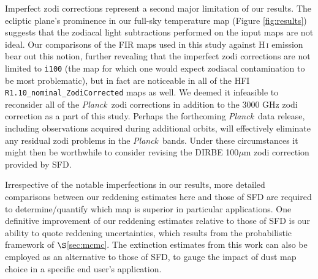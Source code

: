 \documentclass{emulateapj}
\newcommand{\PLANCK}{{\it Planck}}
\begin{document}
Imperfect zodi corrections represent a second major limitation of our results.
The ecliptic plane's prominence in our full-sky temperature map (Figure 
\ref{fig:results}) suggests that the zodiacal light subtractions performed on 
the input maps are not ideal. Our comparisons of the FIR maps used in this 
study against H\,\textsc{i} emission bear out this notion, further revealing 
that the imperfect zodi corrections are not limited to \verb|i100| (the 
map for which one would expect zodiacal contamination to be most 
problematic), but in fact are noticeable in all of the HFI 
\verb|R1.10_nominal_ZodiCorrected| maps as well. We deemed it infeasible to 
reconsider all of the \PLANCK~zodi corrections in addition to the 3000 GHz zodi
correction as a part of this study. Perhaps the forthcoming \PLANCK~data 
release, including observations acquired during additional orbits, will 
effectively eliminate any residual zodi problems in the \PLANCK~bands. Under 
these circumstances it might then be worthwhile to consider revising the DIRBE 
100$\mu$m zodi correction provided by SFD.


Irrespective of the notable imperfections in our results, more detailed
comparisons between our reddening estimates here and those of SFD are required 
to determine/quantify which map is superior in particular applications. One 
definitive improvement of our reddening estimates relative to those of SFD is 
our ability to quote reddening uncertainties, which results from the 
probabilistic framework of $\S$\ref{sec:mcmc}. The extinction estimates 
from this work can also be employed as an alternative to those of SFD, to gauge
the impact of dust map choice in a specific end user's application.




\end{document}
